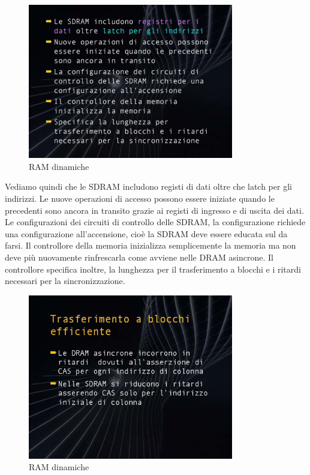 \FloatBarrier
\begin{figure}[H]
  \centering
  \includegraphics[width=0.80\textwidth,
                    trim=30 30 30 30, %
                    clip]
                    {images/Lez04_p06_fig_02.png}
  \caption{RAM dinamiche}
  \label{fig:Lez04_p06_fig_02}
\end{figure}
\FloatBarrier
\noindent

Vediamo quindi che le SDRAM includono registi di dati oltre che latch per gli indirizzi.
Le nuove operazioni di accesso possono essere iniziate quando le precedenti sono ancora in transito grazie ai registi di ingresso e di uscita dei dati.
Le configurazioni dei circuiti di controllo delle SDRAM, la configurazione richiede una configurazione all'accensione, cioè la SDRAM deve essere educata sul da farsi.
Il controllore della memoria inizializza semplicemente la memoria ma non deve più nuovamente rinfrescarla come avviene nelle DRAM asincrone.
Il controllore specifica inoltre, la lunghezza per il trasferimento a blocchi e i ritardi necessari per la sincronizzazione.

\FloatBarrier
\begin{figure}[H]
  \centering
  \includegraphics[width=0.80\textwidth,
                    trim=40 120 40 30, %
                    clip]
                    {images/Lez04_p06_fig_03.png}
  \caption{RAM dinamiche}
  \label{fig:Lez04_p06_fig_03}
\end{figure}
\FloatBarrier
\noindent

